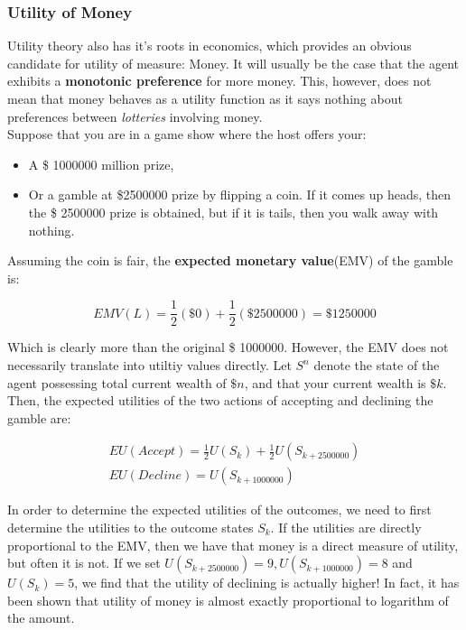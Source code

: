 \documentclass[11pt]{article}
\begin{document}
\subsubsection{Utility of Money}

Utility theory also has it's roots in economics, which provides an obvious candidate for utility of measure: Money. It will usually be the case that the agent exhibits a \textbf{monotonic preference} for more money. This, however, does not mean that money behaves as a utility function as it says nothing about preferences between \textit{lotteries} involving money.\\

Suppose that you are in a game show where the host offers your:

\begin{itemize}
    \item A \$ 1000000 million prize,
    \item Or a gamble at \$2500000 prize by flipping a coin. If it comes up heads, then the \$ 2500000 prize is obtained, but if it is tails, then you walk away with nothing.
\end{itemize}

Assuming the coin is fair, the \textbf{expected monetary value}(EMV) of the gamble is:

$$
EMV(L) = \frac{1}{2}(\$0) + \frac{1}{2}(\$ 2500000) = \$ 1250000
$$

Which is clearly more than the original \$ 1000000. However, the EMV does not necessarily translate into utiltiy values directly. Let $S^n$ denote the state of the agent possessing total current wealth of $\$n$, and that your current wealth is $\$k$. Then, the expected utilities of the two actions of accepting and declining the gamble are:

$$
\begin{gathered}
EU(Accept) = \frac{1}{2}U(S_k) + \frac{1}{2}U(S_{k+2500000})\\
EU(Decline) = U(S_{k+1000000})
\end{gathered}
$$

In order to determine the expected utilities of the outcomes, we need to first determine the utilities to the outcome states $S_k$. If the utilities are directly proportional to the EMV, then we have that money is a direct measure of utility, but often it is not. If we set $U(S_{k+2500000}) = 9, U(S_{k+1000000}) = 8$ and $U(S_{k}) = 5$, we find that the utility of declining is actually higher! In fact, it has been shown that utility of money is almost exactly proportional to logarithm of the amount.\\
\end{document}
